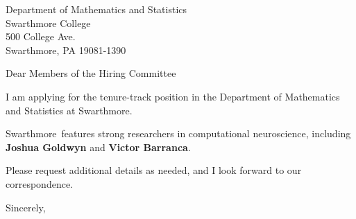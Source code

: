 




	
	
	\def\School{Swarthmore}
	
	\begin{letter}
		{Department of Mathematics and Statistics\\
			Swarthmore College\\
			500 College Ave.\\
			Swarthmore, PA 19081-1390
		}
		
		\opening{Dear Members of the Hiring Committee}
		
		
		I am applying for the tenure-track position in the Department of Mathematics and Statistics at \School. 
		
		
		
		\School~features strong researchers in computational neuroscience, including \textbf{Joshua Goldwyn} and \textbf{Victor Barranca}. 
		
		
		
		
		
		Please request additional details as needed, and I look forward to our correspondence.
		
		\closing{Sincerely,}
	\end{letter}
